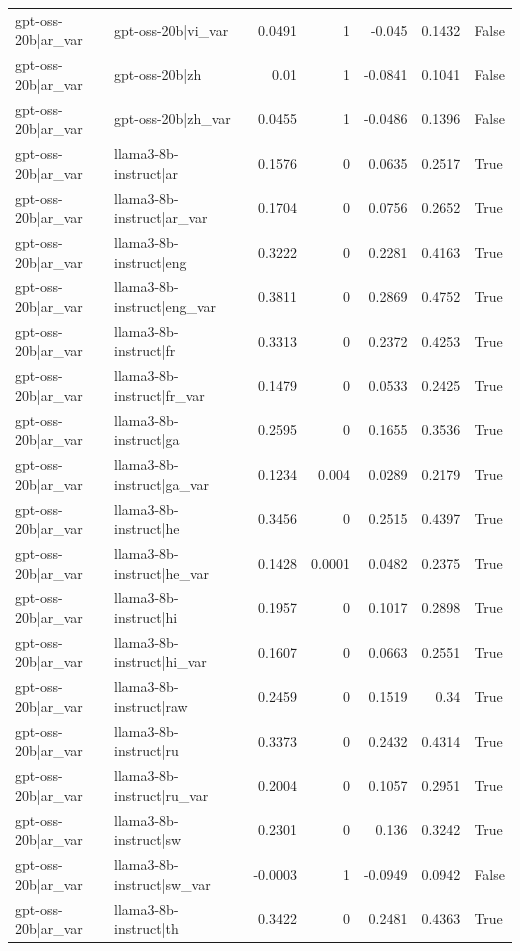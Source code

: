 \begin{table}
\begin{tabular}{l l r r r r l}
gpt-oss-20b|ar_var & gpt-oss-20b|vi_var & 0.0491 & 1 & -0.045 & 0.1432 & False \\
gpt-oss-20b|ar_var & gpt-oss-20b|zh & 0.01 & 1 & -0.0841 & 0.1041 & False \\
gpt-oss-20b|ar_var & gpt-oss-20b|zh_var & 0.0455 & 1 & -0.0486 & 0.1396 & False \\
gpt-oss-20b|ar_var & llama3-8b-instruct|ar & 0.1576 & 0 & 0.0635 & 0.2517 & True \\
gpt-oss-20b|ar_var & llama3-8b-instruct|ar_var & 0.1704 & 0 & 0.0756 & 0.2652 & True \\
gpt-oss-20b|ar_var & llama3-8b-instruct|eng & 0.3222 & 0 & 0.2281 & 0.4163 & True \\
gpt-oss-20b|ar_var & llama3-8b-instruct|eng_var & 0.3811 & 0 & 0.2869 & 0.4752 & True \\
gpt-oss-20b|ar_var & llama3-8b-instruct|fr & 0.3313 & 0 & 0.2372 & 0.4253 & True \\
gpt-oss-20b|ar_var & llama3-8b-instruct|fr_var & 0.1479 & 0 & 0.0533 & 0.2425 & True \\
gpt-oss-20b|ar_var & llama3-8b-instruct|ga & 0.2595 & 0 & 0.1655 & 0.3536 & True \\
gpt-oss-20b|ar_var & llama3-8b-instruct|ga_var & 0.1234 & 0.004 & 0.0289 & 0.2179 & True \\
gpt-oss-20b|ar_var & llama3-8b-instruct|he & 0.3456 & 0 & 0.2515 & 0.4397 & True \\
gpt-oss-20b|ar_var & llama3-8b-instruct|he_var & 0.1428 & 0.0001 & 0.0482 & 0.2375 & True \\
gpt-oss-20b|ar_var & llama3-8b-instruct|hi & 0.1957 & 0 & 0.1017 & 0.2898 & True \\
gpt-oss-20b|ar_var & llama3-8b-instruct|hi_var & 0.1607 & 0 & 0.0663 & 0.2551 & True \\
gpt-oss-20b|ar_var & llama3-8b-instruct|raw & 0.2459 & 0 & 0.1519 & 0.34 & True \\
gpt-oss-20b|ar_var & llama3-8b-instruct|ru & 0.3373 & 0 & 0.2432 & 0.4314 & True \\
gpt-oss-20b|ar_var & llama3-8b-instruct|ru_var & 0.2004 & 0 & 0.1057 & 0.2951 & True \\
gpt-oss-20b|ar_var & llama3-8b-instruct|sw & 0.2301 & 0 & 0.136 & 0.3242 & True \\
gpt-oss-20b|ar_var & llama3-8b-instruct|sw_var & -0.0003 & 1 & -0.0949 & 0.0942 & False \\
gpt-oss-20b|ar_var & llama3-8b-instruct|th & 0.3422 & 0 & 0.2481 & 0.4363 & True \\

\end{tabular}
\end{table}
